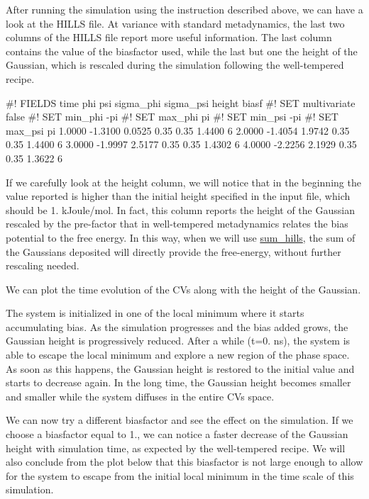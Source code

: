 After running the simulation using the instruction described above, we can have a look at the H\+I\+L\+L\+S file. At variance with standard metadynamics, the last two columns of the H\+I\+L\+L\+S file report more useful information. The last column contains the value of the biasfactor used, while the last but one the height of the Gaussian, which is rescaled during the simulation following the well-\/tempered recipe.

\begin{DoxyVerb}#! FIELDS time phi psi sigma_phi sigma_psi height biasf
#! SET multivariate false
#! SET min_phi -pi
#! SET max_phi pi
#! SET min_psi -pi
#! SET max_psi pi
      1.0000     -1.3100    0.0525          0.35            0.35      1.4400      6
      2.0000     -1.4054    1.9742          0.35            0.35      1.4400      6
      3.0000     -1.9997    2.5177          0.35            0.35      1.4302      6
      4.0000     -2.2256    2.1929          0.35            0.35      1.3622      6
\end{DoxyVerb}


If we carefully look at the height column, we will notice that in the beginning the value reported is higher than the initial height specified in the input file, which should be 1. k\+Joule/mol. In fact, this column reports the height of the Gaussian rescaled by the pre-\/factor that in well-\/tempered metadynamics relates the bias potential to the free energy. In this way, when we will use \hyperlink{sum_hills}{sum\+\_\+hills}, the sum of the Gaussians deposited will directly provide the free-\/energy, without further rescaling needed.

We can plot the time evolution of the C\+Vs along with the height of the Gaussian.

\label{belfast-6_belfast-6-wtb6-fig}%
\hypertarget{belfast-6_belfast-6-wtb6-fig}{}%
 The system is initialized in one of the local minimum where it starts accumulating bias. As the simulation progresses and the bias added grows, the Gaussian height is progressively reduced. After a while (t=0. ns), the system is able to escape the local minimum and explore a new region of the phase space. As soon as this happens, the Gaussian height is restored to the initial value and starts to decrease again. In the long time, the Gaussian height becomes smaller and smaller while the system diffuses in the entire C\+Vs space.

We can now try a different biasfactor and see the effect on the simulation. If we choose a biasfactor equal to 1., we can notice a faster decrease of the Gaussian height with simulation time, as expected by the well-\/tempered recipe. We will also conclude from the plot below that this biasfactor is not large enough to allow for the system to escape from the initial local minimum in the time scale of this simulation.

